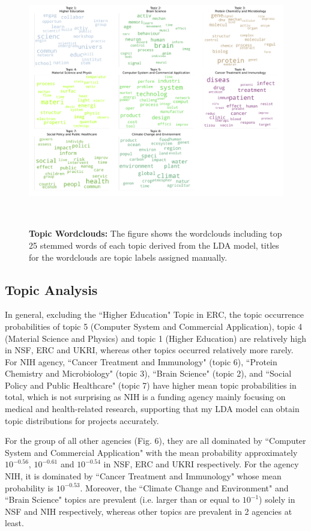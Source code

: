 \begin{figure}[H]
    \centering
    \includegraphics[width = 16cm, height = 11cm]{./img/keywords_word_cloud.pdf}
    \caption[Eight wordclouds of top 25 stemmed words]{\textbf{Topic Wordclouds:} The figure shows the wordclouds including top 25 stemmed words of each topic derived from the LDA model, titles for the wordclouds are topic labels assigned manually.}
\end{figure}

\subsection{Topic Analysis}

In general, excluding the ``Higher Education" Topic in ERC, the topic occurrence probabilities of topic 5 (Computer System and Commercial Application), topic 4 (Material Science and Physics) and topic 1 (Higher Education) are relatively high in NSF, ERC and UKRI, whereas other topics occurred relatively more rarely. For NIH agency, ``Cancer Treatment and Immunology" (topic 6), ``Protein Chemistry and Microbiology" (topic 3), ``Brain Science" (topic 2),  and ``Social Policy and Public Healthcare" (topic 7) have higher mean topic probabilities in total, which is not surprising as NIH is a funding agency mainly focusing on medical and health-related research, supporting that my LDA model can obtain topic distributions for projects accurately.

For the group of all other agencies (Fig. 6), they are all dominated by ``Computer System and Commercial Application" with the mean probability approximately $10^{-0.56}$, $10^{-0.61}$ and $10^{-0.54}$ in NSF, ERC and UKRI respectively. For the agency NIH, it is dominated by ``Cancer Treatment and Immunology" whose mean probability is $10^{-0.53}$. Moreover, the ``Climate Change and Environment" and ``Brain Science" topics are prevalent (i.e. larger than or equal to $10^{-1}$) solely in NSF and NIH respectively, whereas other topics are prevalent in 2 agencies at least.

